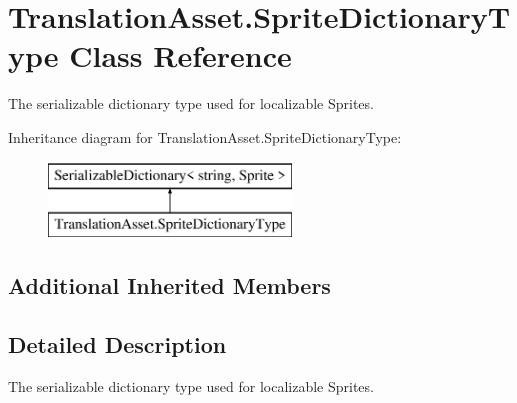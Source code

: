 \hypertarget{class_translation_asset_1_1_sprite_dictionary_type}{}\section{Translation\+Asset.\+Sprite\+Dictionary\+Type Class Reference}
\label{class_translation_asset_1_1_sprite_dictionary_type}


The serializable dictionary type used for localizable Sprites.  


Inheritance diagram for Translation\+Asset.\+Sprite\+Dictionary\+Type\+:\begin{figure}[H]
\begin{center}
\leavevmode
\includegraphics[height=2.000000cm]{class_translation_asset_1_1_sprite_dictionary_type}
\end{center}
\end{figure}
\subsection*{Additional Inherited Members}


\subsection{Detailed Description}
The serializable dictionary type used for localizable Sprites. 

